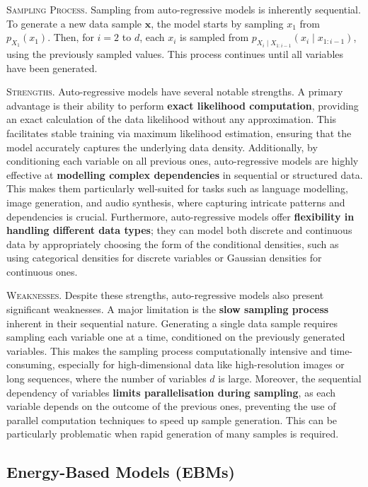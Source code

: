 \textsc{Sampling Process.} Sampling from auto-regressive models is inherently sequential. To generate a new data sample \( \mathbf{x} \), the model starts by sampling \( x_1 \) from \( p_{X_1}(x_1) \). Then, for \( i = 2 \) to \( d \), each \( x_i \) is sampled from \( p_{X_i \mid X_{1:i-1}}(x_i \mid x_{1:i-1}) \), using the previously sampled values. This process continues until all variables have been generated.

\textsc{Strengths.} Auto-regressive models have several notable strengths. A primary advantage is their ability to perform \textbf{exact likelihood computation}, providing an exact calculation of the data likelihood without any approximation. This facilitates stable training via maximum likelihood estimation, ensuring that the model accurately captures the underlying data density. Additionally, by conditioning each variable on all previous ones, auto-regressive models are highly effective at \textbf{modelling complex dependencies} in sequential or structured data. This makes them particularly well-suited for tasks such as language modelling, image generation, and audio synthesis, where capturing intricate patterns and dependencies is crucial. Furthermore, auto-regressive models offer \textbf{flexibility in handling different data types}; they can model both discrete and continuous data by appropriately choosing the form of the conditional densities, such as using categorical densities for discrete variables or Gaussian densities for continuous ones.

\textsc{Weaknesses.} Despite these strengths, auto-regressive models also present significant weaknesses. A major limitation is the \textbf{slow sampling process} inherent in their sequential nature. Generating a single data sample requires sampling each variable one at a time, conditioned on the previously generated variables. This makes the sampling process computationally intensive and time-consuming, especially for high-dimensional data like high-resolution images or long sequences, where the number of variables \( d \) is large. Moreover, the sequential dependency of variables \textbf{limits parallelisation during sampling}, as each variable depends on the outcome of the previous ones, preventing the use of parallel computation techniques to speed up sample generation. This can be particularly problematic when rapid generation of many samples is required.


\subsection{Energy-Based Models (EBMs)}\label{sec:energy_based_models}

